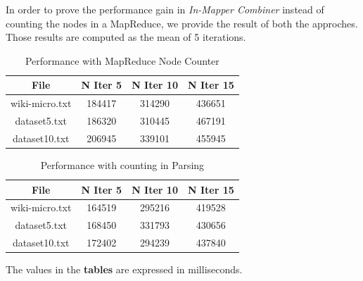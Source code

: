 In order to prove the performance gain in \textit{In-Mapper Combiner} instead of counting the nodes in a MapReduce, we provide the result of both the approches. Those results are computed as the mean of 5 iterations.

\begin{table}[H]
\caption{Performance with MapReduce Node Counter}
\centering
\begin{tabular}{c c c c}
\hline\hline
File & N Iter 5 & N Iter 10 & N Iter 15 \\ [0.7ex] %
\hline
wiki-micro.txt&184417&314290&436651\\
dataset5.txt&186320&310445&467191 \\
dataset10.txt&206945&339101&455945 \\ [1ex]
\hline
\end{tabular}
\label{table:nonlin}
\end{table}

\begin{table}[H]
\caption{Performance with counting in Parsing}
\centering
\begin{tabular}{c c c c}
\hline\hline
File & N Iter 5 & N Iter 10 & N Iter 15 \\ [0.7ex] %
\hline
wiki-micro.txt&164519&295216&419528\\
dataset5.txt&168450&331793&430656 \\
dataset10.txt&172402&294239&437840 \\ [1ex]
\hline
\end{tabular}
\label{table:nonlin}
\end{table}

\noindent The values in the \textbf{tables} are expressed in milliseconds.